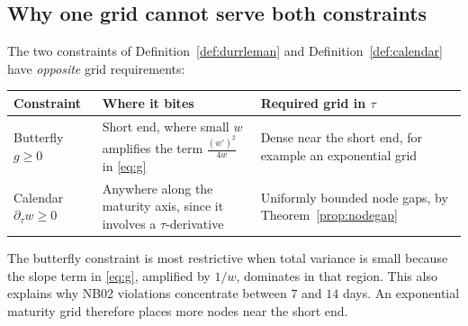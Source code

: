 

\subsection{Why one grid cannot serve both constraints}

The two constraints of Definition~\ref{def:durrleman} and Definition~\ref{def:calendar} have
\emph{opposite} grid requirements:


\begin{center}
\small
\begin{tabularx}{\textwidth}{@{}lXX@{}}
\toprule
\textbf{Constraint} & \textbf{Where it bites} & \textbf{Required grid in $\tau$} \\
\midrule
Butterfly $g\ge0$
& Short end, where small $w$ amplifies the term $\tfrac{(w')^2}{4w}$ in \eqref{eq:g}
& Dense near the short end, for example an exponential grid \\

Calendar $\partial_\tau w\ge0$
& Anywhere along the maturity axis, since it involves a $\tau$-derivative
& Uniformly bounded node gaps, by Theorem~\ref{prop:nodegap} \\
\bottomrule
\end{tabularx}
\end{center}

The butterfly constraint is most restrictive when total variance is small because the slope term in \eqref{eq:g}, amplified by $1/w$, dominates in that region. This also explains why NB02 violations concentrate between $7$ and $14$ days. An exponential maturity grid therefore places more nodes near the short end.

